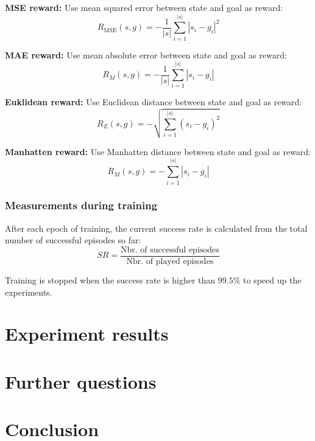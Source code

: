 \textbf{MSE reward:}
Use mean squared error between state and goal as reward:
$$R_{\text{MSE}}(s, g) = -\frac{1}{|s|} \sum_{i=1}^{|s|} \left| s_i - g_i \right|^2$$

\textbf{MAE reward:}
Use mean absolute error between state and goal as reward:
$$R_M(s, g) = -\frac{1}{|s|} \sum_{i=1}^{|s|} \left|s_i - g_i\right|$$

\textbf{Euklidean reward:}
Use Euclidean distance between state and goal as reward:
$$R_E(s, g) = -\sqrt{\sum_{i=1}^{|s|} \left(s_i - g_i\right)^2}$$

\textbf{Manhatten reward:}
Use Manhatten distance between state and goal as reward:
$$R_M(s, g) = -\sum_{i=1}^{|s|} \left|s_i - g_i\right|$$

\subsubsection{Measurements during training}
After each epoch of training, the current success rate is calculated from the total number of successful episodes so far:
$$SR = \frac{\text{Nbr. of successful episodes}}{\text{Nbr. of played episodes}}$$

Training is stopped when the success rate is higher than $99.5\%$ to speed up the experiments.

%
%
\section{Experiment results \label{sec:experiments}}

%
%
\section{Further questions}

%
%
\section{Conclusion}

%
%

